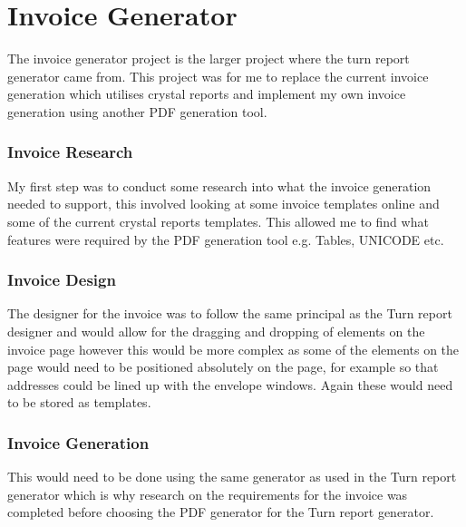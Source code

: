 \section{Invoice Generator}{
	The invoice generator project is the larger project where the turn report generator came from. This project was for me to replace the current invoice generation which utilises crystal reports and implement my own invoice generation using another PDF generation tool.
	\subsubsection*{Invoice Research}{
		My first step was to conduct some research into what the invoice generation needed to support, this involved looking at some invoice templates online and some of the current crystal reports templates. This allowed me to find what features were required by the PDF generation tool e.g. Tables, UNICODE etc.
	}
	\subsubsection*{Invoice Design}{
		The designer for the invoice was to follow the same principal as the Turn report designer and would allow for the dragging and dropping of elements on the invoice page however this would be more complex as some of the elements on the page would need to be positioned absolutely on the page, for example so that addresses could be lined up with the envelope windows. Again these would need to be stored as templates. 
	}
	\subsubsection*{Invoice Generation}{
		This would need to be done using the same generator as used in the Turn report generator which is why research on the requirements for the invoice was completed before choosing the PDF generator for the Turn report generator.
	}
}